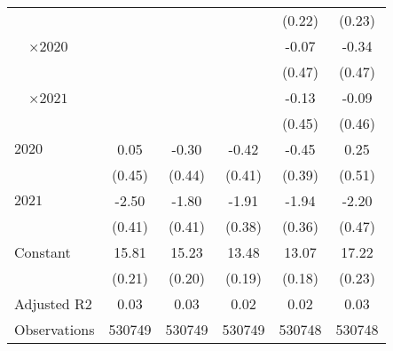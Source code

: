 \begin{tabular}{@{}l*{5}{S[table-format={-}2.2{\tnote{***}}]}@{}}
 &  &  &  & (0.22) & (0.23)\tabularnewline%
~~\(\times 2020\) &  &  &  & -0.07 & -0.34\tabularnewline%
 &  &  &  & (0.47) & (0.47)\tabularnewline%
~~\(\times 2021\) &  &  &  & -0.13 & -0.09\tabularnewline%
 &  &  &  & (0.45) & (0.46)\tabularnewline%
\midrule
\(2020\) & 0.05 & -0.30 & -0.42 & -0.45 & 0.25\tabularnewline%
 & (0.45) & (0.44) & (0.41) & (0.39) & (0.51)\tabularnewline%
\(2021\) & -2.50\tnote{***} & -1.80\tnote{***} & -1.91\tnote{***} & -1.94\tnote{***} & -2.20\tnote{***}\tabularnewline%
 & (0.41) & (0.41) & (0.38) & (0.36) & (0.47)\tabularnewline%
Constant & 15.81\tnote{***} & 15.23\tnote{***} & 13.48\tnote{***} & 13.07\tnote{***} & 17.22\tnote{***}\tabularnewline%
 & (0.21) & (0.20) & (0.19) & (0.18) & (0.23)\tabularnewline%
\midrule
Adjusted R2 & 0.03 & 0.03 & 0.02 & 0.02 & 0.03\tabularnewline%
Observations & {\num{530749}} & {\num{530749}} & {\num{530749}} & {\num{530748}} & {\num{530748}}\tabularnewline%
\bottomrule
\end{tabular}
